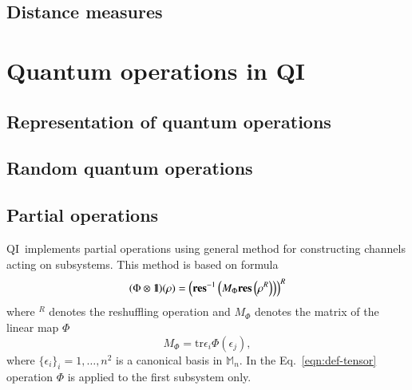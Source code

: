 \documentclass[final,5p,times]{elsarticle}
\newcommand{\res}{\mathbf{res}}
\newcommand{\1}{{\rm 1\hspace{-0.9mm}l}}
\newcommand{\Id}{\1}
\newcommand{\tr}{\mathrm{tr}}
\newcommand{\M}{\ensuremath{\mathbb{M}}}
\newcommand{\qi}{QI}
\begin{document}
\subsection{Distance measures}


\section{Quantum operations in \qi}\label{sec:channels}

\subsection{Representation of quantum operations}

\subsection{Random quantum operations}
\cite{Bruzda2009320}

\subsection{Partial operations}
\qi\ implements partial operations using general method for constructing
channels acting on subsystems. This method is based on formula
\begin{equation}\label{eqn:def-tensor}
(\Phi\otimes\Id)(\rho) = 
\left(\res^{-1}\left(M_\Phi\res\left(\rho^R\right)\right)\right)^R
\end{equation}
where ${}^R$ denotes the reshuffling operation and $M_\Phi$ denotes the matrix
of the linear map $\Phi$
\begin{equation}
M_\Phi = \tr \epsilon_i \Phi(\epsilon_j),
\end{equation}
where $\{\epsilon_i\}_i=1,\ldots,n^2$ is a canonical basis in $\M_n$. In the 
Eq.~\ref{eqn:def-tensor} operation $\Phi$ is applied to the first subsystem 
only.
\end{document}
